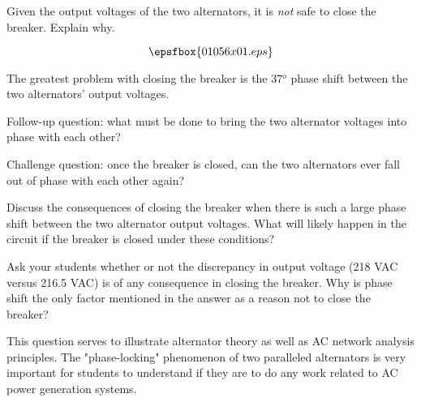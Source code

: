 

Given the output voltages of the two alternators, it is {\it not} safe to close the breaker.  Explain why.

$$\epsfbox{01056x01.eps}$$







The greatest problem with closing the breaker is the 37$^{o}$ phase shift between the two alternators' output voltages.

\vskip 10pt

Follow-up question: what must be done to bring the two alternator voltages into phase with each other?

\vskip 10pt

Challenge question: once the breaker is closed, can the two alternators ever fall out of phase with each other again?







Discuss the consequences of closing the breaker when there is such a large phase shift between the two alternator output voltages.  What will likely happen in the circuit if the breaker is closed under these conditions?

Ask your students whether or not the discrepancy in output voltage (218 VAC versus 216.5 VAC) is of any consequence in closing the breaker.  Why is phase shift the only factor mentioned in the answer as a reason not to close the breaker?

This question serves to illustrate alternator theory as well as AC network analysis principles.  The "phase-locking" phenomenon of two paralleled alternators is very important for students to understand if they are to do any work related to AC power generation systems.



